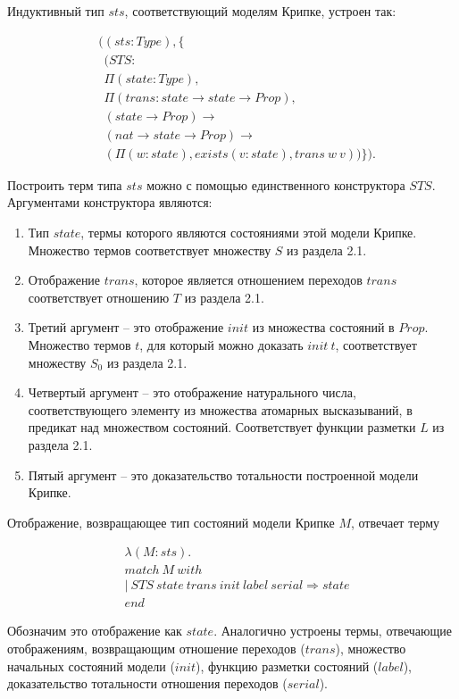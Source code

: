 \documentclass[12pt]{article}
\begin{document}
Индуктивный тип $sts$, соответствующий моделям Крипке, устроен так:


\begin{align*}
& ((sts:Type), \{ \\ 
& \ \ (STS: \\
& \ \ \Pi(state:Type), \\ 
& \ \ \Pi(trans : state \xrightarrow{} state \xrightarrow{} Prop), \\
& \ \ (state \xrightarrow{} Prop) \xrightarrow{} \\ 
& \ \ (nat \xrightarrow{} state \xrightarrow{} Prop) \xrightarrow{} \\
& \ \ (\Pi (w : state), exists (v : state), trans\ w\ v)) \}).
\end{align*}

Построить терм типа $sts$ можно с помощью единственного конструктора $STS$. Аргументами конструктора являются:
\begin{enumerate}
    \item Тип $state$, термы которого являются состояниями этой модели Крипке. Множество термов соответствует множеству $S$  из раздела 2.1.
    \item Отображение $trans$, которое является отношением переходов $trans$ соответствует отношению $T$ из раздела 2.1.
    \item Третий аргумент -- это отображение $init$ из множества состояний в $Prop$. Множество термов $t$, для который можно доказать $init\ t$, соответствует множеству $S_0$ из раздела 2.1.
    \item Четвертый аргумент -- это отображение натурального числа, соответствующего элементу из множества атомарных высказываний, в предикат над множеством состояний. Соответствует функции разметки $L$ из раздела 2.1. 
    \item Пятый аргумент -- это доказательство тотальности построенной модели Крипке.
\end{enumerate}

Отображение, возвращающее тип состояний модели Крипке $M$, отвечает терму

\begin{align*}
&\lambda (M:sts).\\
& match\ M\ with \\
& |\ STS\ state\ trans\ init\ label\ serial \Rightarrow state \\
& end
\end{align*}

Обозначим это отображение как $state$.
Аналогично устроены термы, отвечающие отображениям, возвращающим отношение переходов ($trans$), множество начальных состояний модели ($init$), функцию разметки состояний ($label$), доказательство тотальности отношения переходов ($serial$).
\end{document}
